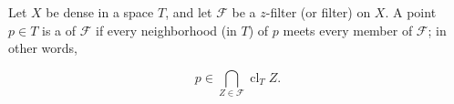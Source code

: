 Let $X$ be dense in a space $T$, and let $\mathcal{F}$ be a $z$-filter (or filter) on $X$. A point $p \in T$ is a  of $\mathcal{F}$ if every neighborhood (in $T$) of $p$ meets every member of $\mathcal{F}$; in other words,

$$p \in \bigcap_{Z \in \mathcal{F}} \operatorname{cl}_T Z.$$

